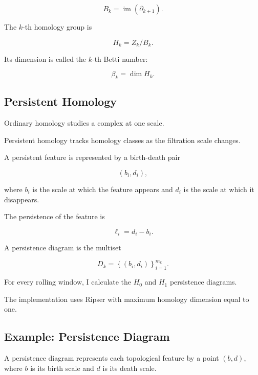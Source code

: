 \documentclass[oneside,english,11pt]{article}
\renewcommand{\boxed}[1]{#1}
\begin{document}
\begin{equation}
B_k=\operatorname{im}(\partial_{k+1}).
\end{equation}

The $k$-th homology group is

\begin{equation}
\boxed{
H_k=Z_k/B_k.
}
\end{equation}

Its dimension is called the $k$-th Betti number:

\begin{equation}
\boxed{
\beta_k=\dim H_k.
}
\end{equation}

\subsection{Persistent Homology}

Ordinary homology studies a complex at one scale.

Persistent homology tracks homology classes
as the filtration scale changes.

A persistent feature is represented by a
birth-death pair

\begin{equation}
(b_i,d_i),
\end{equation}

where $b_i$ is the scale at which the feature
appears and $d_i$ is the scale at which it disappears.

The persistence of the feature is

\begin{equation}
\boxed{
\ell_i=d_i-b_i.
}
\end{equation}

A persistence diagram is the multiset

\begin{equation}
\boxed{
D_k=
\left\{
(b_i,d_i)
\right\}_{i=1}^{m_k}.
}
\end{equation}

For every rolling window, I calculate the
$H_0$ and $H_1$ persistence diagrams.

The implementation uses Ripser with
maximum homology dimension equal to one.

\subsection{Example: Persistence Diagram}

A persistence diagram represents each
topological feature by a point $(b,d)$,
where $b$ is its birth scale and
$d$ is its death scale.
\end{document}
